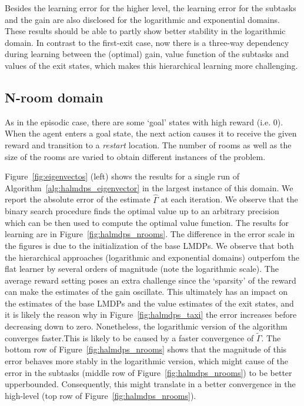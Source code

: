 Besides the learning error for the higher level, the learning error for the subtasks and the gain are also disclosed for the logarithmic and exponential domains. These results should be able to partly show better stability in the logarithmic domain. In contrast to the first-exit case, now there is a three-way dependency during learning between the (optimal) gain, value function of the subtasks and values of the exit states, which makes this hierarchical learning more challenging.  

  \subsection{N-room domain}
 As in the episodic case, there are some `goal' states with high reward (i.e. $0$). When the agent enters a goal state, the next action causes it to receive the given reward and transition to a {\it restart\/} location. The number of rooms as well as the size of the rooms are varied to obtain different instances of the problem.   
 
 Figure~\ref{fig:eigenvectos} (left) shows the results for a single run of Algorithm~\ref{alg:halmdps_eigenvector} in the largest instance of this domain. We report the absolute error of the estimate $\widehat\Gamma$ at each iteration. We observe that the binary search procedure finds the optimal value up to an arbitrary precision which can be then used to compute the optimal value function. The results for learning are in Figure~\ref{fig:halmdps_nrooms}. The difference in the error scale in the figures is due to the initialization of the base LMDPs. We observe that both the hierarchical approaches (logarithmic and exponential domains) outperfom the flat learner by several orders of magnitude (note the logarithmic scale).  The average reward setting poses an extra challenge since the `sparsity' of the reward can make the estimates of the gain oscillate. This ultimately has an impact on the estimates of the base LMDPs and the value estimates of the exit states, and it is likely the reason why in Figure~\ref{fig:halmdps_taxi} the error increases before decreasing down to zero. Nonetheless, the logarithmic version of the algorithm converges faster.This is likely to be caused by a faster convergence of $\widetilde \Gamma$. The bottom row of Figure~\ref{fig:halmdps_nrooms} shows that the magnitude of this error behaves more stably in the logarithmic version, which might cause of the error in the subtasks (middle row of Figure~\ref{fig:halmdps_nrooms}) to be better upperbounded. Consequently, this might translate in a better convergence in the high-level (top row of Figure~\ref{fig:halmdps_nrooms}).

